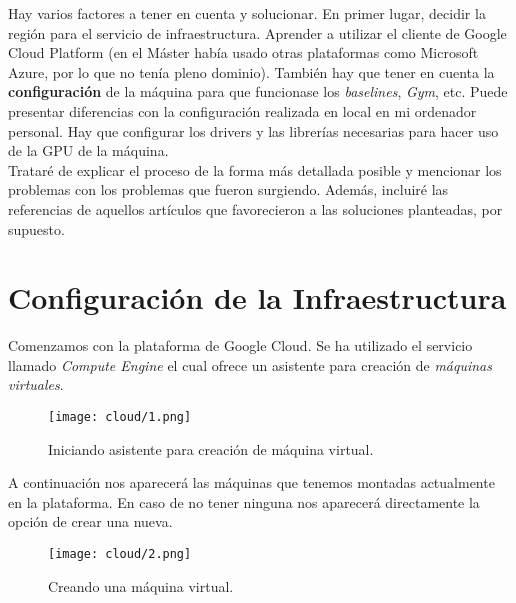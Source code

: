 \documentclass[11pt,fleqn]{book} %
\begin{document}
Hay varios factores a tener en cuenta y solucionar. En primer lugar, decidir la región para el servicio de infraestructura. Aprender a utilizar el cliente de Google Cloud Platform (en el Máster había usado otras plataformas como Microsoft Azure, por lo que no tenía pleno dominio). También hay que tener en cuenta la \textbf{configuración} de la máquina para que funcionase los \textit{baselines}, \textit{Gym}, etc. Puede presentar diferencias con la configuración realizada en local en mi ordenador personal. Hay que configurar los drivers y las librerías necesarias para hacer uso de la GPU de la máquina. \\

Trataré de explicar el proceso de la forma más detallada posible y mencionar los problemas con los problemas que fueron surgiendo. Además, incluiré las referencias de aquellos artículos que favorecieron a las soluciones planteadas, por supuesto. \\

\section{Configuración de la Infraestructura}\label{sec:infraestructura}

Comenzamos con la plataforma de Google Cloud. Se ha utilizado el servicio llamado \textit{Compute Engine} el cual ofrece un asistente para creación de \textit{máquinas virtuales}. \\

\begin{figure}[H]
	\centering\texttt{[image: cloud/1.png]}
	\caption{Iniciando asistente para creación de máquina virtual.}
	\label{fig:cloud1} %
\end{figure}

A continuación nos aparecerá las máquinas que tenemos montadas actualmente en la plataforma. En caso de no tener ninguna nos aparecerá directamente la opción de crear una nueva. \\

\begin{figure}[H]
	\centering\texttt{[image: cloud/2.png]}
	\caption{Creando una máquina virtual.}
	\label{fig:cloud2} %
\end{figure}
\end{document}
